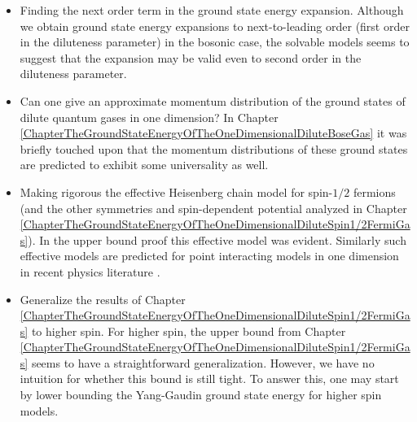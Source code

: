 \begin{itemize}
	\item Finding the next order term in the ground state energy expansion. Although we obtain ground state energy expansions to next-to-leading order (first order in the diluteness parameter) in the bosonic case, the solvable models seems to suggest that the expansion may be valid even to second order in the diluteness parameter.
	\item Can one give an approximate momentum distribution of the ground states of dilute quantum gases in one dimension? In Chapter \ref{ChapterTheGroundStateEnergyOfTheOneDimensionalDiluteBoseGas} it was briefly touched upon that the momentum distributions of these ground states are predicted to exhibit some universality as well.
	\item Making rigorous the effective Heisenberg chain model for spin-$ 1/2$ fermions (and the other symmetries and spin-dependent potential analyzed in Chapter \ref{ChapterTheGroundStateEnergyOfTheOneDimensionalDiluteSpin1/2FermiGas}). In the upper bound proof this effective model was evident. Similarly such effective models are predicted for point interacting models in one dimension in recent physics literature \cite{yang2016effective,volosniev2015engineering}.
	\item Generalize the results of Chapter \ref{ChapterTheGroundStateEnergyOfTheOneDimensionalDiluteSpin1/2FermiGas} to higher spin. For higher spin, the upper bound from Chapter \ref{ChapterTheGroundStateEnergyOfTheOneDimensionalDiluteSpin1/2FermiGas} seems to have a straightforward generalization. However, we have no intuition for whether this bound is still tight. To answer this, one may start by lower bounding the Yang-Gaudin ground state energy for higher spin models.
\end{itemize}



